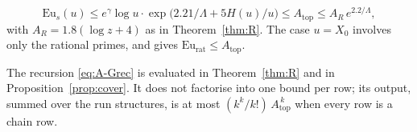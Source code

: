\begin{lemma}
\begin{enumerate}[label=(\arabic*),leftmargin=*]
\begin{enumerate}[label=(\alph*)]
    \[
      \mathrm{Eu}_s(u)\le e^{\gamma}\log u\cdot\exp\bigl(2.21/\Lambda+5H(u)/u\bigr)\le A_{\mathrm{top}}\le A_R\,e^{2.2/\Lambda},
    \]
    with $A_R=1.8(\log z+4)$ as in Theorem~\ref{thm:R}. The case $u=X_0$ involves only the rational primes, and gives
    $\mathrm{Eu}_{\mathrm{rat}}\le A_{\mathrm{top}}$.
  \end{enumerate}
  The recursion \eqref{eq:A-Grec} is evaluated in Theorem~\ref{thm:R} and in Proposition~\ref{prop:cover}. It does not
  factorise into one bound per row; its output, summed over the run structures, is at most
  $(k^k/k!)\,A_{\mathrm{top}}^{\,k}$ when every row is a chain row.
\end{enumerate}
\end{lemma}

